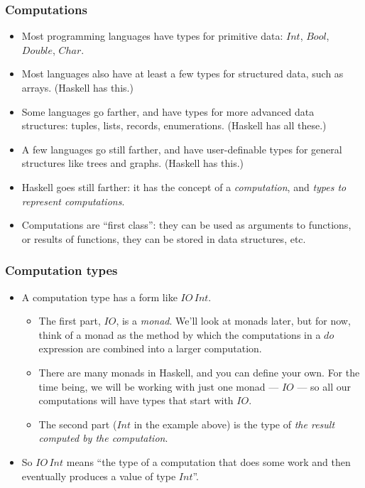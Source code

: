 \documentclass{beamer}
\begin{document}
\begin{frame}
\frametitle{Computations}

\begin{itemize}
\item Most programming languages have types for primitive data:
  $Int$, $Bool$, $Double$, $Char$.
\item Most languages also have at least a few types for structured
  data, such as arrays.  (Haskell has this.)
\item Some languages go farther, and have types for more advanced
  data structures: tuples, lists, records, enumerations.  (Haskell
  has all these.)
\item A few languages go still farther, and have user-definable
  types for general structures like trees and graphs.  (Haskell has
  this.)
\item Haskell goes still farther: it has the concept of a
  \emph{computation}, and \emph{types to represent computations}.
\item Computations are ``first class'': they can be used as
  arguments to functions, or results of functions, they can be
  stored in data structures, etc.
\end{itemize}

\end{frame}

\begin{frame}[fragile]
\frametitle{Computation types}

\begin{itemize}
\item A computation type has a form like $IO\,Int$.
  \begin{itemize}
  \item The first part, $IO$, is a \emph{monad}.  We'll look at
    monads later, but for now, think of a monad as the method by
    which the computations in a $do$ expression are combined into a
    larger computation.
  \item There are many monads in Haskell, and you can define your
    own.  For the time being, we will be working with just one
    monad --- $IO$ --- so all our computations will have types that
    start with $IO$.
  \item The second part ($Int$ in the example above) is the type of
    \emph{the result computed by the computation}.
  \end{itemize}
\item So $IO\,Int$ means ``the type of a computation that does some
  work and then eventually produces a value of type $Int$''.
\end{itemize}

\end{frame}
\end{document}
